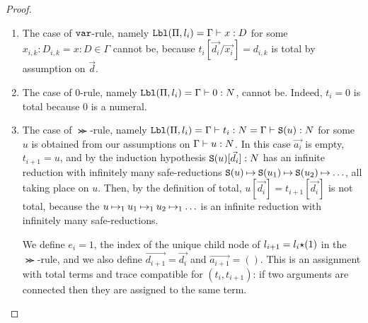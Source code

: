 \begin{proof}
\begin{enumerate}
\item
  The case of ${\tt var}$-rule, namely ${\tt Lbl}(\Pi,l_i) = \Gamma\vdash x:D$ 
  for some $x_{i,k}:D_{i,k} = x:D \in \Gamma$
  cannot be, because $t_i [\vec{d_i}/\vec{x_i}] = d_{i,k}$ is total  by assumption on $\vec{d}$.
  
\item
  The case of $0$-rule, namely ${\tt Lbl}(\Pi,l_i) = \Gamma\vdash 0:{N}$, 
  cannot be. Indeed, $t_i = 0$ is total because $0$ is a numeral.



\item 
  The case of $\Succ$-rule, 
  namely ${\tt Lbl}(\Pi,l_i) = \Gamma\vdash t_i: {N} = \Gamma\vdash {\tt S}(u): {N}$
  for some $u$ is obtained from our assumptions on
  $\Gamma\vdash u: {N}$. In this case $\vec{a_i}$ is empty, $t_{i+1}=u$, and
  by the induction hypothesis ${\tt S}(u)[\vec{d_i}]:{N}$ has an infinite reduction with
  infinitely many safe-reductions
  ${\tt S}(u) \mathbin{\mapsto}  {\tt S}(u_1) \mathbin{\mapsto} {\tt S}(u_2) \mathbin{\mapsto} \ldots$,
  all taking place on $u$.
  Then, by the definition of total, $u[\vec{d_i}] =t_{i+1}[\vec{d_i}] $ is not total, because the
 $u \mathbin{\mapsto}_1  u_1 \mathbin{\mapsto}_1 u_2 \mathbin{\mapsto}_1 \ldots$ is an infinite reduction with
  infinitely many safe-reductions.

  We define $e_{i}=1$, 
  the index of the unique child node of $l_{i+1}=l_i{\star}(1)$ in the $\Succ$-rule, and
  we also define $\vec{d_{i+1}} = \vec{d_i}$ and $\vec{a_{i+1}} = ()$. 
  This is an assignment with total terms and 
  trace compatible for $(t_i,t_{i+1})$: if two arguments are connected then they are assigned
  to the same term. 




\end{enumerate}
\end{proof}
